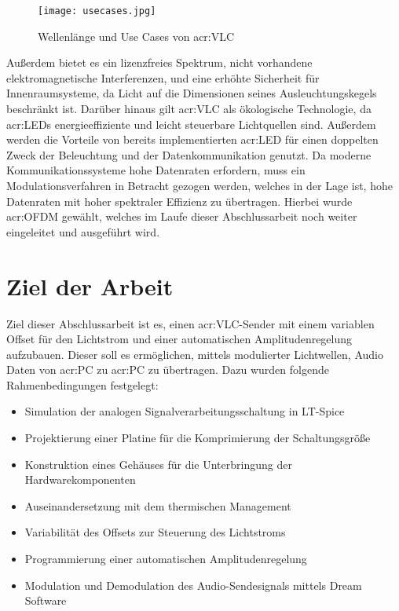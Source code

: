 \begin{figure}[H]
	\centering
	\texttt{[image: usecases.jpg]}
	\caption[Wellenlänge und Use Cases von \gls{acr:VLC}]{Wellenlänge und Use Cases von \gls{acr:VLC}} 
	\cite{usecase}
	\label{fig:usecasevlc}
\end{figure}

Außerdem bietet es ein lizenzfreies Spektrum, nicht vorhandene elektromagnetische Interferenzen, und eine erhöhte Sicherheit für Innenraumsysteme, da Licht auf die Dimensionen seines Ausleuchtungskegels beschränkt ist. Darüber hinaus gilt \gls{acr:VLC} als ökologische Technologie, da \gls{acr:LED}s energieeffiziente und leicht steuerbare Lichtquellen sind.\cite{ghassemlooyVisibleLightCommunications} Außerdem werden die Vorteile von bereits implementierten \gls{acr:LED} für einen doppelten Zweck der Beleuchtung und der Datenkommunikation genutzt. Da moderne Kommunikationssysteme hohe Datenraten erfordern, muss ein Modulationsverfahren in Betracht gezogen werden, welches in der Lage ist, hohe Datenraten mit hoher spektraler Effizienz zu übertragen.\cite{vlc2} Hierbei wurde \gls{acr:OFDM} gewählt, welches im Laufe dieser Abschlussarbeit noch weiter eingeleitet und ausgeführt wird.


\section{Ziel der Arbeit}
\label{sec:The aim of the work}


Ziel dieser Abschlussarbeit ist es, einen \gls{acr:VLC}-Sender mit einem variablen Offset für den Lichtstrom und einer automatischen Amplitudenregelung aufzubauen. Dieser soll es ermöglichen, mittels modulierter Lichtwellen, Audio Daten von \gls{acr:PC} zu \gls{acr:PC} zu übertragen. Dazu wurden folgende Rahmenbedingungen festgelegt: 

\begin{itemize}
	\item Simulation der analogen Signalverarbeitungsschaltung in LT-Spice
	\item Projektierung einer Platine für die Komprimierung der Schaltungsgröße
	\item Konstruktion eines Gehäuses für die Unterbringung der Hardwarekomponenten
	\item Auseinandersetzung mit dem thermischen Management
	\item Variabilität des Offsets zur Steuerung des Lichtstroms
	\item Programmierung einer automatischen Amplitudenregelung
	\item Modulation und Demodulation des Audio-Sendesignals mittels Dream Software
\end{itemize}




